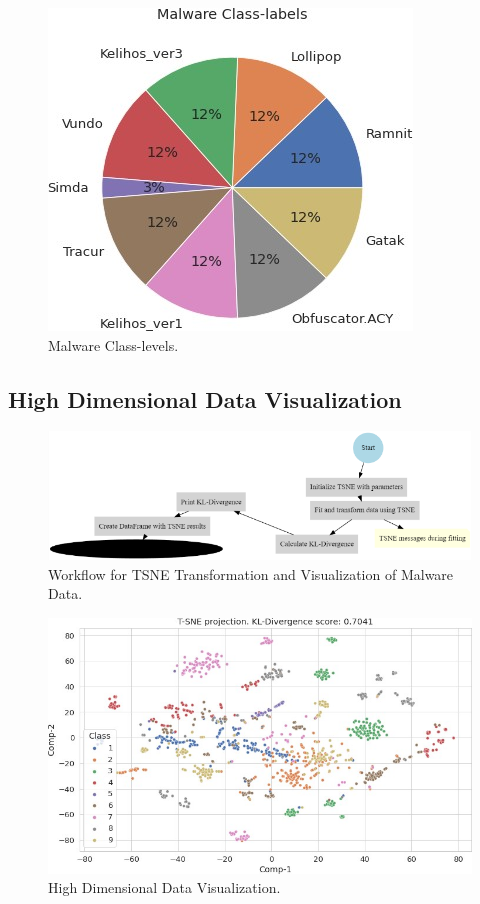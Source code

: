 \documentclass[conference]{IEEEtran}
\begin{document}
\begin{figure}[H]
    \centerline{\includegraphics[width=0.7\linewidth]{fig7}}
    \caption{Malware Class-levels.}
    \label{fig7}
\end{figure}


\subsection{High Dimensional Data Visualization}

\begin{figure}[H]
    \centerline{\includegraphics[width=0.7\linewidth]{fig8}}
    \caption{Workflow for TSNE Transformation and Visualization of Malware Data.}
    \label{fig8}
\end{figure}

\begin{figure}[H]
    \centerline{\includegraphics[width=0.7\linewidth]{fig9}}
    \caption{High Dimensional Data Visualization.}
    \label{fig9}
\end{figure}
\end{document}
